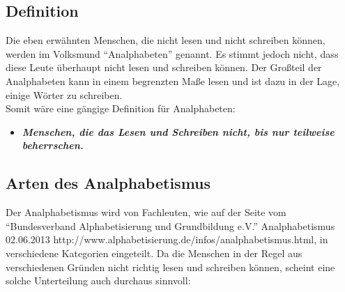 \subsection{Definition}



Die eben erwähnten Menschen, die nicht lesen und nicht schreiben können, werden im Volksmund "`Analphabeten"' genannt. Es stimmt jedoch nicht, dass diese Leute überhaupt nicht lesen und schreiben können. Der Großteil der Analphabeten kann in einem begrenzten Maße lesen und ist dazu in der Lage, einige Wörter zu schreiben.\\

Somit wäre eine gängige Definition für Analphabeten:\\
\begin{itemize}
	\item \textbf{\textit{Menschen, die das Lesen und Schreiben nicht, bis nur teilweise beherrschen.}}
\end{itemize}



\subsection{Arten des Analphabetismus}

Der Analphabetismus wird von Fachleuten, wie auf der Seite vom "`Bundesverband Alphabetisierung und Grundbildung e.V."'
				{Analphabetismus}
				{02.06.2013}
				{http://www.alphabetisierung.de/infos/analphabetismus.html}, 
in verschiedene Kategorien eingeteilt. Da die Menschen in der Regel aus verschiedenen Gründen nicht richtig lesen und schreiben können, scheint eine solche Unterteilung auch durchaus sinnvoll:

